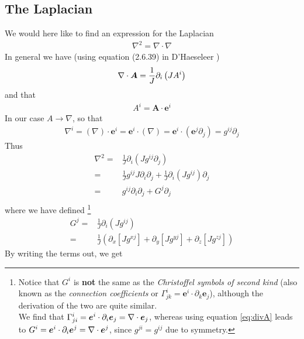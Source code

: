 \documentclass[12pt]{article}
\def\L{\left}
\def\R{\right}
\newcommand{\Grad}{\ensuremath{\nabla}}
\newcommand{\ve}[1]{\ensuremath{\boldsymbol{#1}}}
\newcommand{\Div}[1]{\ensuremath{\nabla\cdot #1 }}
\begin{document}
\subsection{The Laplacian}
%
We would here like to find an expression for the Laplacian
%
\begin{align*}
    \Grad^2 = \Div \Grad
\end{align*}
%
In general we have (using equation (2.6.39) in D'Haeseleer \cite{haeseler-1})
%
\begin{align}
    \Div \ve{A} = \frac{1}{J} \partial_i \L(JA^i\R)
    \label{eq:divA}
\end{align}
%
and that
%
\begin{align*}
    A^i = \ve{A}\cdot \ve{e}^i
\end{align*}
%
In our case $A \to \Grad$, so that
%
\begin{align*}
    \Grad^i = \L(\Grad\R)\cdot \ve{e}^i
             = \ve{e}^i \cdot \L(\Grad\R)
             = \ve{e}^i \cdot \L(\ve{e}^j \partial_j\R)
             = g^{ij} \partial_j
\end{align*}
%
Thus
%
\begin{align*}
    \Grad^2 =& \frac{1}{J} \partial_i \L(J g^{ij} \partial_j\R)\\
            =& \frac{1}{J} g^{ij} J \partial_i \partial_j
             + \frac{1}{J} \partial_i \L(J g^{ij} \R) \partial_j\\
            =& g^{ij} \partial_i \partial_j
             + G^j \partial_j\\
\end{align*}
%
where we have defined%
%
\footnote{%
Notice that $G^i$ is \textbf{not} the same as the \emph{Christoffel symbols of
second kind} (also known as the \emph{connection coefficients} or
$\Gamma^i_{jk}=\ve{e}^i\cdot\partial_k \ve{e}_j$), although the derivation of
the two are quite similar.\\
We find that $\Gamma^i_{ji}=\ve{e}^i\cdot\partial_i \ve{e}_j = \Div \ve{e}_j$,
whereas using equation \ref{eq:divA} leads to
$G^i=\ve{e}^i\cdot\partial_i \ve{e}^j = \Div \ve{e}^j$, since $g^{ji}=g^{ij}$
due to
symmetry.
}%
%
\begin{align*}
    G^j =& \frac{1}{J} \partial_i \L(J g^{ij} \R)\\
        =& \frac{1}{J} \L(
           \partial_x \L[J g^{xj} \R]
         + \partial_y \L[J g^{yj} \R]
         + \partial_z \L[J g^{zj} \R]
         \R)
\end{align*}
%
By writing the terms out, we get
%
\end{document}
